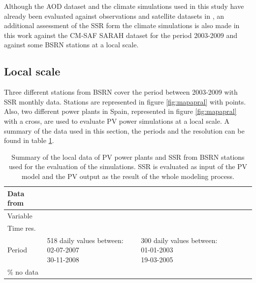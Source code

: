 Although the AOD dataset and the climate simulations used in this study have already been evaluated against observations and satellite datasets in \cite*{Nabat2013, Nabat2015, Nabat2015a}, an additional assessment of the SSR form the climate simulations is also made in this work against the CM-SAF SARAH dataset \cite*{Muller2015} for the period 2003-2009 and against some BSRN \cite*{Konig-Langlo2013} stations at a local scale. 

\subsection{Local scale}

Three different stations from BSRN cover the period between 2003-2009 with SSR monthly data. Stations are represented in figure \ref{fig:mapapral} with points. Also, two different power plants in Spain, represented in figure \ref{fig:mapapral} with a cross, are used to evaluate PV power simulations at a local scale. A summary of the data used in this section, the periods and the resolution can be found in table \ref{localData}.


\begin{table}[h!]
  \begin{tabular}{>{\raggedright}m{2cm}>{\raggedright}m{2cm}>{\raggedright}m{2cm}>{\raggedright}m{2cm}>{\raggedright}m{2cm}>{\raggedright}m{2cm}}
    \toprule 
    Data from & \centering{Seville} & \centering{Tarragona} & \centering{Payerne} &\centering{Sede Boker} &\centering{Carpentras}\tabularnewline
    \midrule
    Variable & \centering{PV productivity} & \centering{PV productivity} & \centering{SSR} & \centering{SSR} & \centering{SSR} 
\tabularnewline
    \midrule
    Time res. & \centering{day} & \centering{day} & \centering{month} & \centering{month} & \centering{month}
                    \tabularnewline
   \midrule
                                                                                            Period & \centering{518 {\small{daily values between:}} 02-07-2007\\30-11-2008} & \centering{300 {\small{daily values between:}} 01-01-2003\\19-03-2005} & \centering{2003-2009} & \centering{2003-2009} & \centering{2003-2009}
                  \tabularnewline    
 \midrule
    $\%$ no data & \centering{0} & \centering{8 $\%$} & \centering{0} & \centering{10.71 $\%$} & \centering{0}
                    \tabularnewline

 \bottomrule
  \end{tabular}
  \caption{Summary of the local data of PV power plants and SSR from BSRN stations used for the evaluation of the simulations. SSR is evaluated as input of the PV model and the PV output as the result of the whole modeling process.}
  \label{localData}
\end{table}

